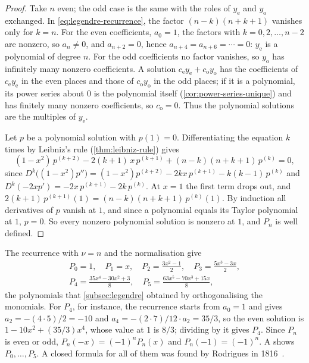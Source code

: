 \begin{proof}
Take $n$ even; the odd case is the same with the roles of $y_{\mathrm e}$ and $y_{\mathrm o}$ exchanged. In \eqref{eq:legendre-recurrence}, the factor $(n-k)(n+k+1)$ vanishes only for $k=n$. For the even coefficients, $a_0=1$, the factors with $k=0,2,\ldots,n-2$ are nonzero, so $a_n\ne0$, and $a_{n+2}=0$, hence $a_{n+4}=a_{n+6}=\cdots=0$: $y_{\mathrm e}$ is a polynomial of degree $n$. For the odd coefficients no factor vanishes, so $y_{\mathrm o}$ has infinitely many nonzero coefficients. A solution $c_{\mathrm e}y_{\mathrm e}+c_{\mathrm o}y_{\mathrm o}$ has the coefficients of $c_{\mathrm e}y_{\mathrm e}$ in the even places and those of $c_{\mathrm o}y_{\mathrm o}$ in the odd places; if it is a polynomial, its power series about $0$ is the polynomial itself (\cref{cor:power-series-unique}) and has finitely many nonzero coefficients, so $c_{\mathrm o}=0$. Thus the polynomial solutions are the multiples of $y_{\mathrm e}$.

Let $p$ be a polynomial solution with $p(1)=0$. Differentiating the equation $k$ times by Leibniz's rule (\cref{thm:leibniz-rule}) gives
\[
(1-x^2)\,p^{(k+2)}-2(k+1)\,x\,p^{(k+1)}+(n-k)(n+k+1)\,p^{(k)}=0 ,
\]
since $D^k\bigl((1-x^2)p''\bigr)=(1-x^2)p^{(k+2)}-2kx\,p^{(k+1)}-k(k-1)\,p^{(k)}$ and $D^k(-2xp')=-2x\,p^{(k+1)}-2k\,p^{(k)}$. At $x=1$ the first term drops out, and $2(k+1)\,p^{(k+1)}(1)=(n-k)(n+k+1)\,p^{(k)}(1)$. By induction all derivatives of $p$ vanish at $1$, and since a polynomial equals its Taylor polynomial at $1$, $p=0$. So every nonzero polynomial solution is nonzero at $1$, and $P_n$ is well defined.
\end{proof}

The recurrence with $\nu=n$ and the normalisation give
\begin{gather*}
P_0=1,\quad P_1=x,\quad P_2=\frac{3x^2-1}2,\quad P_3=\frac{5x^3-3x}2,\\
P_4=\frac{35x^4-30x^2+3}8,\quad P_5=\frac{63x^5-70x^3+15x}8 ,
\end{gather*}
the polynomials that \cref{subsec:legendre} obtained by orthogonalising the monomials. For $P_4$, for instance, the recurrence starts from $a_0=1$ and gives $a_2=-(4\cdot5)/2=-10$ and $a_4=-(2\cdot7)/12\cdot a_2=35/3$, so the even solution is $1-10x^2+(35/3)x^4$, whose value at $1$ is $8/3$; dividing by it gives $P_4$. Since $P_n$ is even or odd, $P_n(-x)=(-1)^nP_n(x)$ and $P_n(-1)=(-1)^n$. A shows $P_0,\ldots,P_5$. A closed formula for all of them was found by Rodrigues in 1816~\cite{rodrigues1816}.

